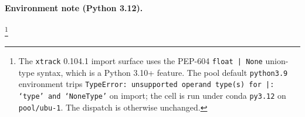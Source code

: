 \paragraph{Environment note (Python 3.12).}\footnote{The \texttt{xtrack}
0.104.1 import surface uses the PEP-604 \texttt{float\,|\,None}
union-type syntax, which is a Python 3.10+ feature. The pool default
\texttt{python3.9} environment trips
\texttt{TypeError: unsupported operand type(s) for |: `type' and `NoneType'}
on import; the cell is run under conda \texttt{py3.12} on
\texttt{pool/ubu-1}. The dispatch is otherwise unchanged.}
